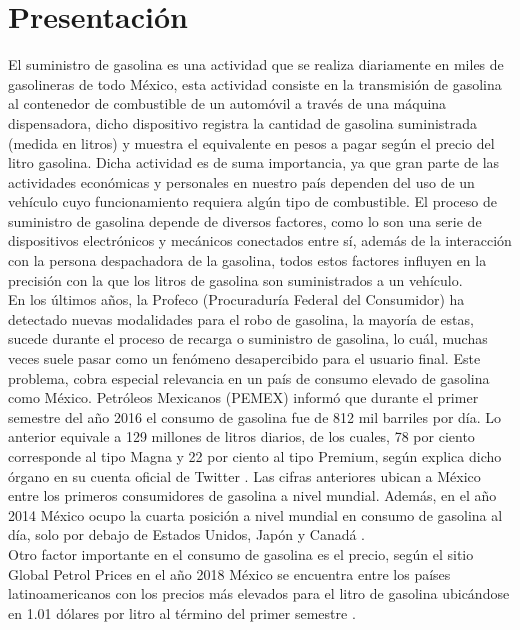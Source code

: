 
\section{Presentación} %
El suministro de gasolina es una actividad que se realiza diariamente en miles de gasolineras de todo México, esta actividad consiste en la transmisión de gasolina al contenedor de combustible de un automóvil a través de una máquina dispensadora, dicho dispositivo registra la cantidad de gasolina suministrada (medida en litros) y muestra el equivalente en pesos a pagar según el precio del litro gasolina.
Dicha actividad es de suma importancia, ya que gran parte de las actividades económicas y personales en nuestro país dependen del uso de un vehículo cuyo funcionamiento requiera algún tipo de combustible. El proceso de suministro de gasolina depende de diversos factores, como lo son una serie de dispositivos electrónicos y mecánicos conectados entre sí, además de la interacción con la persona despachadora de la gasolina, todos estos factores influyen en la precisión con la que los litros de gasolina son suministrados a un vehículo.
\\
En los últimos años, la Profeco (Procuraduría Federal del Consumidor) ha detectado nuevas modalidades para el robo de gasolina, la mayoría de estas, sucede durante el proceso de recarga o suministro de gasolina, lo cuál, muchas veces suele pasar como un fenómeno desapercibido para el usuario final. 
Este problema, cobra especial relevancia en un país de consumo elevado de gasolina como México. Petróleos Mexicanos (PEMEX) informó que durante el primer semestre del año 2016 el consumo de gasolina fue de 812 mil barriles por día. Lo anterior equivale a 129 millones de litros diarios, de los cuales, 78 por ciento corresponde al tipo Magna y 22 por ciento al tipo Premium, según explica dicho órgano en su cuenta oficial de Twitter \citep{Pre1}.
Las cifras anteriores ubican a México entre los primeros consumidores de gasolina a nivel mundial. Además, en el año 2014 México ocupo la cuarta posición a nivel mundial en consumo de gasolina al día, solo por debajo de Estados Unidos, Japón y Canadá \citep{Pre2}.
\\
Otro factor importante en el consumo de gasolina es el precio, según el sitio Global Petrol Prices en el año 2018 México se encuentra entre los países latinoamericanos con los precios más elevados para el litro de gasolina ubicándose en 1.01 dólares por litro al término del primer semestre \citep{Pre3}.

